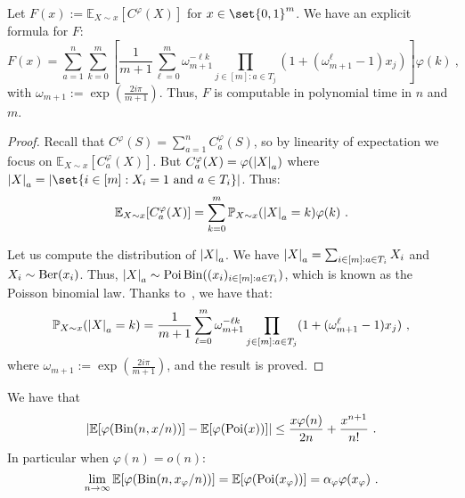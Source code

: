 \begin{proposition}
  Let $F(x) := \mathbb{E}_{X \sim x}[C^{\varphi}(X)]$ for $x \in \set{0,1}^m$. We have an explicit formula for $F$:
  \[  F(x) = \sum_{a = 1}^n \sum_{k=0}^{m} \left[\frac{1}{m+1}\sum_{\ell = 0}^{m} \omega_{m+1}^{-\ell k}\prod_{j \in [m] : a \in  T_j}(1 +(\omega_{m+1}^{\ell}-1)x_j)\right]\varphi(k) \ , \]
  with $\omega_{m+1} := \exp(\frac{2i\pi}{m+1})$. Thus, $F$ is computable in polynomial time in $n$ and $m$.
  \label{prop:Fpoly}
\end{proposition}

\begin{proof}
  Recall that $C^{\varphi}(S) = \sum_{a=1}^n C_a^{\varphi}(S)$, so by linearity of expectation we focus on $\mathbb{E}_{X \sim x}[C_a^{\varphi}(X)]$. But $C_a^{\varphi}(X) = \varphi(\abs{X}_a)$ where $\abs{X}_a = \abs{\set{ i \in [m] : X_i = 1 \text{ and } a \in T_i}}$. Thus:
  \[ \mathbb{E}_{X \sim x}[C_a^{\varphi}(X)] = \sum_{k=0}^{m} \mathbb{P}_{X \sim x}(\abs{X}_a=k)\varphi(k)\ .\]

  Let us compute the distribution of $\abs{X}_a$. We have $\abs{X}_a = \sum_{i \in [m] : a \in T_i} X_i$ and $X_i \sim \operatorname{\text{Ber}}(x_i)$. Thus, $\abs{X}_a \sim \operatorname{\text{Poi}}\operatorname{\text{Bin}}((x_i)_{i \in [m] : a \in T_i})$, which is known as the Poisson binomial law. Thanks to~\cite{FW10}, we have that:
  \[ \mathbb{P}_{X \sim x}(\abs{X}_a=k) = \frac{1}{m+1}\sum_{\ell = 0}^{m} \omega_{m+1}^{-\ell k}\prod_{j \in [m] : a \in  T_j}(1 +(\omega_{m+1}^{\ell}-1)x_j)\ ,\]
  where $\omega_{m+1} := \exp(\frac{2i\pi}{m+1})$, and the result is proved.
\end{proof}

\begin{proposition}
  We have that
  \[ \abs{\mathbb{E}[\varphi(\operatorname{\text{Bin}}(n,x/n))] - \mathbb{E}[\varphi(\operatorname{\text{Poi}}(x))]} \leq \frac{x \varphi(n)}{2n} + \frac{x^{n+1}}{n!} \ .\]
  In particular when $\varphi(n) = o(n)$:
  \[ \lim_{n \rightarrow  \infty} \mathbb{E}[\varphi(\operatorname{\text{Bin}}(n,x_{\varphi}/n))] = \mathbb{E}[\varphi(\operatorname{\text{Poi}}(x_{\varphi}))] = \alpha_{\varphi}\varphi(x_{\varphi}) \ . \]
  \label{prop:UnboundBinPoi}
\end{proposition}

